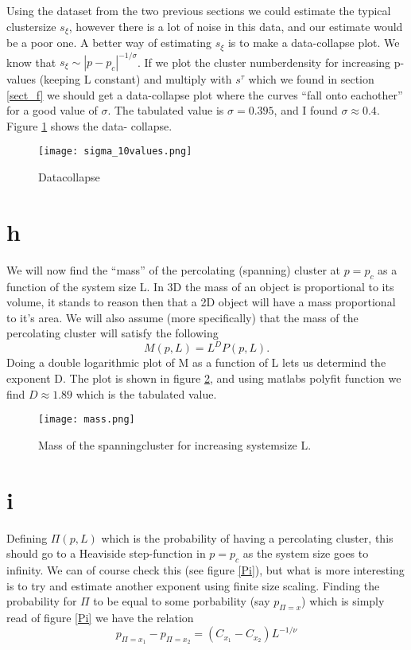 \documentclass[a4paper,english, 10pt, twoside]{article}
\begin{document}
Using the dataset from the two previous sections we could estimate the typical clustersize $s_\xi$, however 
there is a lot of noise in this data, and our estimate would be a poor one. A better way of estimating $s_\xi$ 
is to make a data-collapse plot. We know that $s_\xi \sim |p-p_c|^{-1/\sigma}$. If we plot the cluster 
numberdensity for increasing p-values (keeping L constant) and multiply with $s^\tau$ which we found in section 
\ref{sect_f} we should get a data-collapse plot where the curves ``fall onto eachother'' for a good value of $\sigma$. 
The tabulated value is $\sigma = 0.395$, and I found $\sigma \approx 0.4$. Figure \ref{sigma} shows the data-
collapse.

\begin{figure}[H]
 \centering
 \texttt{[image: sigma\_10values.png]}
 \caption{Datacollapse}
 \label{sigma}
\end{figure}

\section*{h}

We will now find the ``mass'' of the percolating (spanning) cluster at $p = p_c$ as a function of the system size L. 
In 3D the mass of an object is proportional to its volume, it stands to reason then that a 2D object will have a mass 
proportional to it's area. We will also assume (more specifically) that the mass of the percolating cluster will 
satisfy the following
$$
M(p,L) = L^D P(p,L).
$$
Doing a double logarithmic plot of M as a function of L lets us determind the exponent D. The plot is shown in 
figure \ref{mass_D}, and using matlabs polyfit function we find $D \approx 1.89$ which is the tabulated value.
\begin{figure}[H]
 \centering
 \texttt{[image: mass.png]}
 \caption{Mass of the spanningcluster for increasing systemsize L.}
 \label{mass_D}
\end{figure}

\section*{i}

Defining $\Pi(p,L)$ which is the probability of having a percolating cluster, this should go to a Heaviside 
step-function in $p = p_c$ as the system size goes to infinity. We can of course check this (see figure \ref{Pi}), 
but what is more interesting is to try and estimate another exponent using finite size scaling. Finding the probability 
for $\Pi$ to be equal to some porbability (say $p_{\Pi = x}$) which is simply read of figure \ref{Pi} we have the 
relation 
\begin{equation}\label{blergh}
 p_{\Pi = x_1} - p_{\Pi = x_2} = (C_{x_1} - C_{x_2})L^{-1/\nu}
\end{equation}
\end{document}
